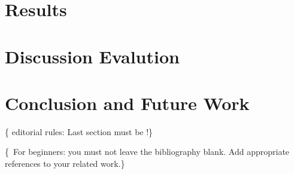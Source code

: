 \documentclass[conference,flushend]{iaria}
\begin{document}
\section{Results}
\lipsum[24]

\section{Discussion \textbar{} Evalution}
\lipsum[25]

\section{Conclusion and Future Work}
\{\faWarning{}  editorial rules: Last section must be !\}
\lipsum[26]

\{\,\faWarning{} For beginners: you must not leave the bibliography blank. Add appropriate references to your related work.\}

\begingroup
\sloppy
\printbibliography
\endgroup 
\end{document}
